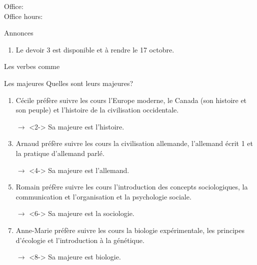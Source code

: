 \documentclass{beamer}
\subtitle[Études et verbes \lexi{préférer}]{Vos études et les verbes comme \lexi{préférer}}
\begin{document}
  \begin{frame}
    \titlepage
    \tiny{Office: \\
          Office hours: }
  \end{frame}

  \begin{frame}{Annonces}
    \begin{center}
      \begin{enumerate}
        \item Le devoir 3 est disponible et à rendre le 17 octobre.
        \item[] 
      \end{enumerate}
    \end{center}
  \end{frame}

  \begin{frame}{Les verbes comme }
    \begin{center}
      
    \end{center}
  \end{frame}

  \begin{frame}{Les majeures}
    Quelles sont leurs majeures?
    \begin{enumerate}
      \item Cécile préfère suivre les cours l'Europe moderne, le Canada (son histoire et son peuple) et l'histoire de la civilisation occidentale.
      \item[$\to$]<2-> Sa majeure est l'histoire.
      \item<3-> Arnaud préfère suivre les cours la civilisation allemande, l'allemand écrit 1 et la pratique d'allemand parlé.
      \item[$\to$]<4-> Sa majeure est l'allemand.
      \item<5-> Romain préfère suivre les cours l'introduction des concepts sociologiques, la communication et l'organisation et la psychologie sociale.
      \item[$\to$]<6-> Sa majeure est la sociologie.
      \item<7-> Anne-Marie préfère suivre les cours la biologie expérimentale, les principes d'écologie et l'introduction à la génétique.
      \item[$\to$]<8-> Sa majeure est biologie.
    \end{enumerate}
  \end{frame}
\end{document}
